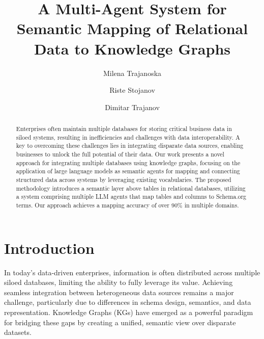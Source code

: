 \documentclass[runningheads]{llncs}
\begin{document}
%
\title{A Multi-Agent System for Semantic Mapping of Relational Data to Knowledge Graphs}
%
%
\author{Milena Trajanoska \and Riste Stojanov \and
Dimitar Trajanov}
%
%
%
\maketitle              %
%
\begin{abstract}
    Enterprises often maintain multiple databases for storing critical business data in siloed systems, resulting in inefficiencies and challenges with data interoperability. A key to overcoming these challenges lies in integrating disparate data sources, enabling businesses to unlock the full potential of their data. Our work presents a novel approach for integrating multiple databases using knowledge graphs, focusing on the application of large language models as semantic agents for mapping and connecting structured data across systems by leveraging existing vocabularies. The proposed methodology introduces a semantic layer above tables in relational databases, utilizing a system comprising multiple LLM agents that map tables and columns to Schema.org terms. Our approach achieves a mapping accuracy of over 90\% in multiple domains.

\end{abstract}
%
%
%
\section{Introduction}

In today's data-driven enterprises, information is often distributed across multiple siloed databases, limiting the ability to fully leverage its value. Achieving seamless integration between heterogeneous data sources remains a major challenge, particularly due to differences in schema design, semantics, and data representation. Knowledge Graphs (KGs) \cite{hogan2021knowledge} have emerged as a powerful paradigm for bridging these gaps by creating a unified, semantic view over disparate datasets.
\end{document}

